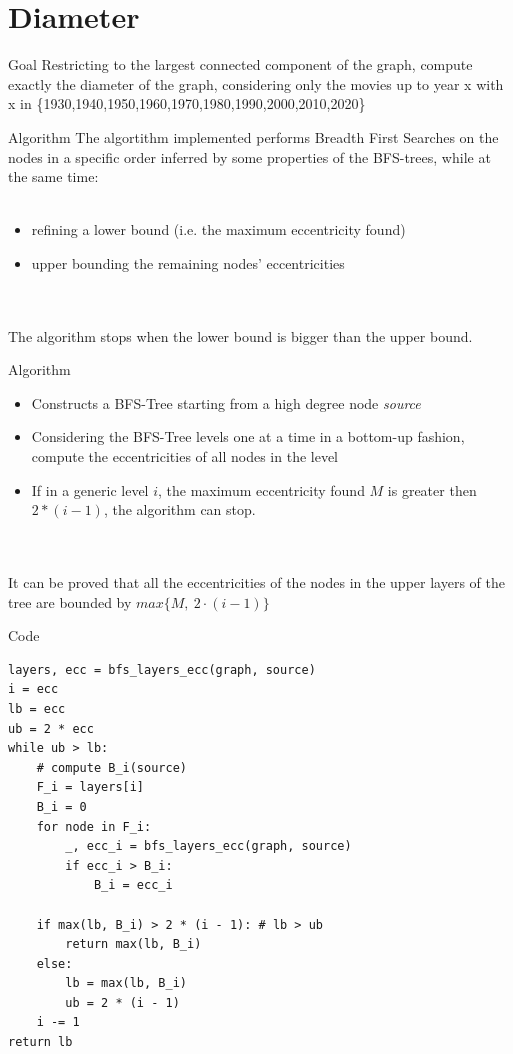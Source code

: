 \section{Diameter}
\begin{frame}{Goal}
Restricting to the largest connected component of the graph, compute exactly the diameter of the graph, considering only the movies up to year x with x in \{1930,1940,1950,1960,1970,1980,1990,2000,2010,2020\}
\end{frame}
\begin{frame}{Algorithm}
The algortithm implemented performs Breadth First Searches on the nodes in a specific order inferred by some properties of the BFS-trees, while at the same time: \\ \ \\
\begin{itemize}
    \item refining a lower bound (i.e. the maximum eccentricity found)
    \item upper bounding the remaining nodes' eccentricities
\end{itemize}
\ \\ \ \\
The algorithm stops when the lower bound is bigger than the upper bound.
\end{frame}
\begin{frame}{Algorithm}
\begin{itemize}
    \item Constructs a BFS-Tree starting from a high degree node \emph{source}
    \item Considering the BFS-Tree levels one at a time in a bottom-up fashion, compute the eccentricities of all nodes in the level
    \item If in a generic level $i$, the maximum eccentricity found $M$ is greater then $2*(i-1)$, the algorithm can stop.
\end{itemize}
\ \\ \ \\
It can be proved that all the eccentricities of the nodes in the upper layers of the tree are bounded by $max \{M,\ 2 \cdot(i-1)\}$
\end{frame}
\begin{frame}[fragile]{Code}
\begin{lstlisting}
layers, ecc = bfs_layers_ecc(graph, source)
i = ecc
lb = ecc
ub = 2 * ecc
while ub > lb:
    # compute B_i(source)
    F_i = layers[i]
    B_i = 0
    for node in F_i:
        _, ecc_i = bfs_layers_ecc(graph, source)
        if ecc_i > B_i:
            B_i = ecc_i

    if max(lb, B_i) > 2 * (i - 1): # lb > ub
        return max(lb, B_i)
    else:
        lb = max(lb, B_i)
        ub = 2 * (i - 1)
    i -= 1
return lb
\end{lstlisting}
\end{frame}
